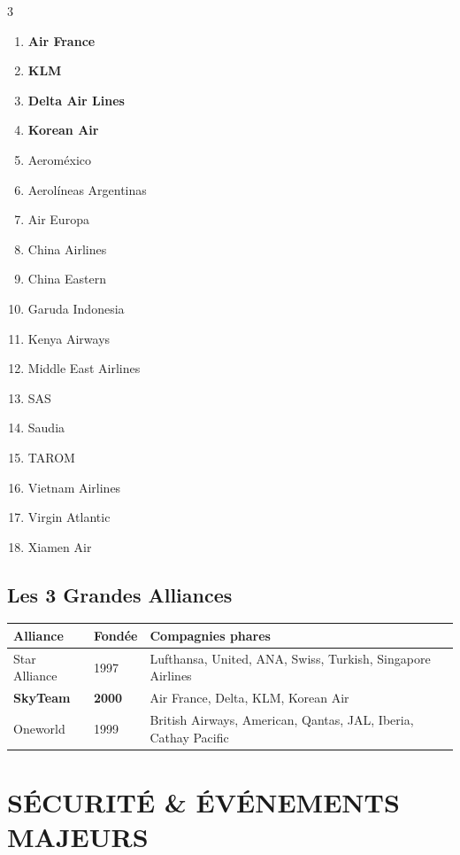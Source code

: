 \documentclass[11pt,a4paper]{article}
\begin{document}
\begin{multicols}{3}
\begin{enumerate}[nosep]
\item \textbf{Air France}
\item \textbf{KLM}
\item \textbf{Delta Air Lines}
\item \textbf{Korean Air}
\item Aeroméxico
\item Aerolíneas Argentinas
\item Air Europa
\item China Airlines
\item China Eastern
\item Garuda Indonesia
\item Kenya Airways
\item Middle East Airlines
\item SAS
\item Saudia
\item TAROM
\item Vietnam Airlines
\item Virgin Atlantic
\item Xiamen Air
\end{enumerate}
\end{multicols}

\subsection{Les 3 Grandes Alliances}

\begin{tabular}{p{3cm}p{1.5cm}p{10cm}}
\toprule
\textbf{Alliance} & \textbf{Fondée} & \textbf{Compagnies phares} \\
\midrule
Star Alliance & 1997 & Lufthansa, United, ANA, Swiss, Turkish, Singapore Airlines \\
\textbf{SkyTeam} & \textbf{2000} & Air France, Delta, KLM, Korean Air \\
Oneworld & 1999 & British Airways, American, Qantas, JAL, Iberia, Cathay Pacific \\
\bottomrule
\end{tabular}

\section{SÉCURITÉ \& ÉVÉNEMENTS MAJEURS}
\end{document}
